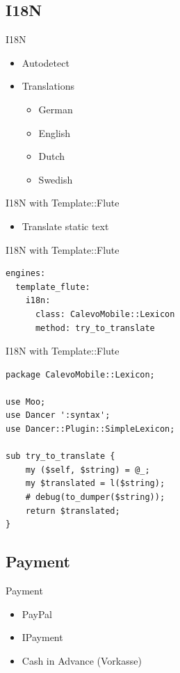 \subsection{I18N}
\begin{frame}{I18N}
\begin{itemize}
\item Autodetect
\item Translations
\begin{itemize}
\item German
\item English
\item Dutch
\item Swedish
\end{itemize}
\end{itemize}
\end{frame}

\begin{frame}[fragile]{I18N with Template::Flute}
\begin{itemize}
\item Translate static text
\end{itemize}
\end{frame}

\begin{frame}[fragile]{I18N with Template::Flute}
\begin{lstlisting}
engines:
  template_flute:
    i18n:
      class: CalevoMobile::Lexicon
      method: try_to_translate
\end{lstlisting}
\end{frame}

\begin{frame}[fragile]{I18N with Template::Flute}
\begin{lstlisting}
package CalevoMobile::Lexicon;

use Moo;
use Dancer ':syntax';
use Dancer::Plugin::SimpleLexicon;

sub try_to_translate {
    my ($self, $string) = @_;
    my $translated = l($string);
    # debug(to_dumper($string));
    return $translated;
}
\end{lstlisting}
\end{frame}

\subsection{Payment}
\begin{frame}{Payment}
\begin{itemize}
\item PayPal
\item IPayment
\item Cash in Advance (Vorkasse)
\end{itemize}
\end{frame}

